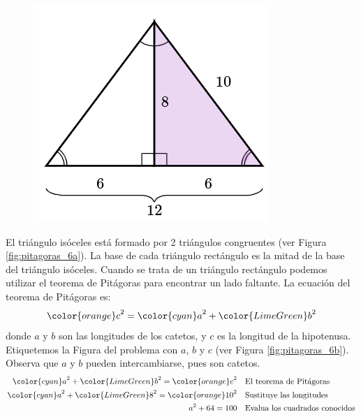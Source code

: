 \begin{solutionbox}{13cm}
\begin{minipage}{0.2\textwidth}
\begin{figure}[H]
            \includegraphics[width=0.9\linewidth]{../images/pitagoras6c.png}
            \caption{}
            \label{fig:pitagoras_6c}
        \end{figure}
    \end{minipage}\hfill
    \begin{minipage}{0.75\textwidth}
        El triángulo isóceles está formado por 2 triángulos congruentes (ver Figura \ref{fig:pitagoras_6a}).
        La base de cada triángulo rectángulo es la mitad de la base del triángulo isóceles.
        Cuando se trata de un triángulo rectángulo podemos utilizar el teorema de Pitágoras para encontrar un lado faltante.
        La ecuación del teorema de Pitágoras es:
        \[{\color{orange}c}^2={\color{cyan}a}^2+{\color{LimeGreen}b}^2\]
        donde $a$ y $b$ son las longitudes de los catetos, y $c$ es la longitud de la hipotenusa.
        Etiquetemos la Figura del problema con $a$, $b$ y $c$ (ver Figura \ref{fig:pitagoras_6b}).
        Observa que $a$ y $b$ pueden intercambiarse, pues son catetos.
        \begin{align*}
            {\color{cyan}a}^2+{\color{LimeGreen}b}^2  ={\color{orange}c}^2  & \text{\quad El teorema de Pitágoras}                          \\
            {\color{cyan}a}^2+{\color{LimeGreen}8}^2  ={\color{orange}10}^2 & \text{\quad Sustituye las longitudes}                         \\
            a^2+64   =100                                                   & \text{\quad Evalua los cuadrados conocidos}                   \\

\end{align*}
\end{minipage}
\end{solutionbox}
